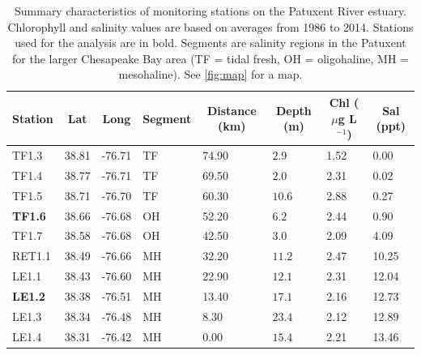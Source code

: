 \documentclass[letterpaper,12pt,oneside]{article}\usepackage[]{graphicx}\usepackage[]{color}
\newcommand{\mugl}{$\mu$g L$^{-1}$}
\begin{document}
\begin{table}[!tbp]
\caption{Summary characteristics of monitoring stations on the Patuxent River estuary.  Chlorophyll and salinity values are based on averages from 1986 to 2014.  Stations used for the analysis are in bold.  Segments are salinity regions in the Patuxent for the larger Chesapeake Bay area (TF = tidal fresh, OH = oligohaline, MH = mesohaline).  See \cref{fig:map} for a map.\label{tab:statsum}} 
\begin{center}
\begin{tabular}{llllllll}
\hline\hline
\multicolumn{1}{l}{Station}&\multicolumn{1}{c}{Lat}&\multicolumn{1}{c}{Long}&\multicolumn{1}{c}{Segment}&\multicolumn{1}{c}{Distance (km)}&\multicolumn{1}{c}{Depth (m)}&\multicolumn{1}{c}{Chl (\mugl)}&\multicolumn{1}{c}{Sal (ppt)}\tabularnewline
\hline
TF1.3&38.81&-76.71&TF&74.90&$ 2.9$&1.52& 0.00\tabularnewline
TF1.4&38.77&-76.71&TF&69.50&$ 2.0$&2.31& 0.02\tabularnewline
TF1.5&38.71&-76.70&TF&60.30&$10.6$&2.88& 0.27\tabularnewline
{\bf TF1.6}&38.66&-76.68&OH&52.20&$ 6.2$&2.44& 0.90\tabularnewline
TF1.7&38.58&-76.68&OH&42.50&$ 3.0$&2.09& 4.09\tabularnewline
RET1.1&38.49&-76.66&MH&32.20&$11.2$&2.47&10.25\tabularnewline
LE1.1&38.43&-76.60&MH&22.90&$12.1$&2.31&12.04\tabularnewline
{\bf LE1.2}&38.38&-76.51&MH&13.40&$17.1$&2.16&12.73\tabularnewline
LE1.3&38.34&-76.48&MH& 8.30&$23.4$&2.12&12.89\tabularnewline
LE1.4&38.31&-76.42&MH& 0.00&$15.4$&2.21&13.46\tabularnewline
\hline
\end{tabular}\end{center}

\end{table}


\end{document}
